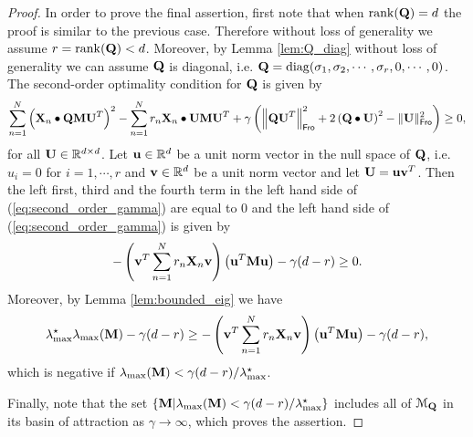 \documentclass[11pt]{article}
\theoremstyle{plain}
\DeclareMathOperator*{\rank}{rank}
\DeclareMathOperator*{\diag}{diag}
\def\R{\mathbb{R}}
\theoremstyle{plain}
\numberwithin{equation}{section}
\numberwithin{lemma}{section}
\numberwithin{theorem}{section}
\numberwithin{corollary}{section}
\numberwithin{observation}{section}
\numberwithin{definition}{section}
\numberwithin{example}{section}
\begin{document}
\begin{proof}
In order to prove the final assertion, first note that when $\rank(\Mx{Q}) = d$ the proof is similar to the previous case. Therefore without loss of generality we assume  $ r = \rank(\Mx{Q}) <d$. Moreover, by Lemma \ref{lem:Q_diag} without loss of generality we can assume $\Mx{Q}$ is diagonal, i.e. $\Mx{Q}= \diag(\sigma_1,\sigma_2,\cdots,\sigma_r,0,\cdots,0)$. The second-order optimality condition for $\Mx{Q}$ is given by
\begin{equation} \label{eq:second_order_gamma}
\sum_{n=1}^N \left( \Mx{X}_n \bullet \Mx{Q}\Mx{M U}^T \right)^2 - \sum_{n = 1}^N r_n \Mx{X}_n \bullet \Mx{UMU}^T +\gamma\left( \left\|\Mx{QU}^T \right\|_{
    \sf Fro}^2+ 2\left(\Mx{Q}\bullet \Mx{U}\right)^2 - \|\Mx{U}\|_{\sf Fro}^2 \right) \geq 0,    
\end{equation}
for all $\Mx{U}\in \R^{d \times d}$. Let $\V{u} \in \R^d$ be a unit norm vector in the null space of $\Mx{Q}$, i.e. $u_i =0$ for $i =1,\cdots,r$ and $\V{v} \in \R^d$ be a unit norm vector and let $\Mx{U} = \V{uv}^T$. Then the left first, third and the fourth term in the left hand side of (\ref{eq:second_order_gamma}) are equal to 0 and the left hand side of (\ref{eq:second_order_gamma}) is given by
\[
-\left(\V{v}^T\sum_{n=1}^N {r_n}\Mx{X}_n \V{v} \right) \left( \V{u}^T \Mx{M} \V{u}\right) - \gamma (d-r) \geq 0.
\]
Moreover, by Lemma \ref{lem:bounded_eig} we have
\[
\lambda^{\star}_{\max} \lambda_{\max}(\Mx{M})- \gamma (d-r) \geq -\left(\V{v}^T\sum_{n=1}^N {r_n}\Mx{X}_n \V{v} \right) \left( \V{u}^T \Mx{M} \V{u}\right) - \gamma (d-r),
\]
which is negative if $\lambda_{\max}(\Mx{M}) < \gamma (d-r)/\lambda^{\star}_{\max}$.

Finally, note that the set $\{\Mx{M} | \lambda_{\max}(\Mx{M}) < \gamma (d-r)/ \lambda^{\star}_{\max} \}$ includes all of $\mathcal{M}_{\Mx{Q}}$ in its basin of attraction as $\gamma \rightarrow \infty$, which proves the assertion.
\end{proof}
\end{document}
